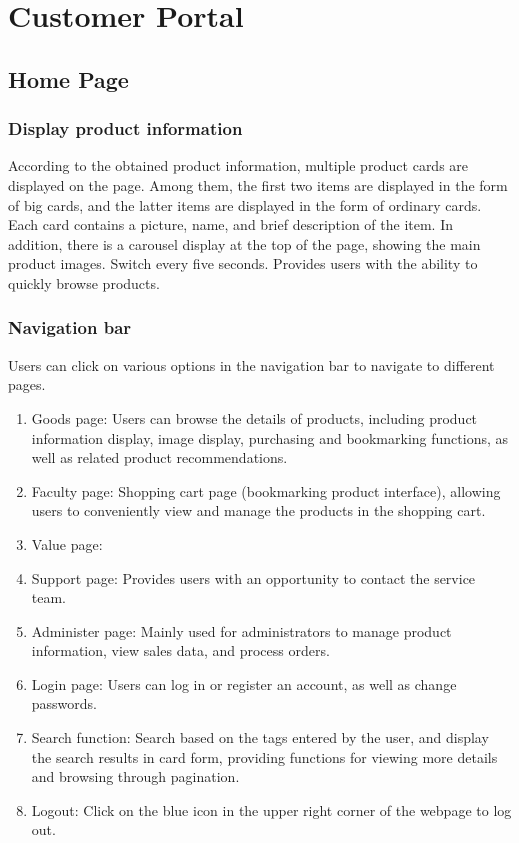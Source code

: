\documentclass{article}
\begin{document}
\section{Customer Portal}
\subsection{Home Page}
\subsubsection{Display product information}
According to the obtained product information, multiple product cards are displayed on the page. Among them, the first two items are displayed in the form of big cards, and the latter items are displayed in the form of ordinary cards. Each card contains a picture, name, and brief description of the item. In addition, there is a carousel display at the top of the page, showing the main product images. Switch every five seconds. Provides users with the ability to quickly browse products.

\subsubsection{Navigation bar}
Users can click on various options in the navigation bar to navigate to different pages.
\begin{enumerate}
    \item Goods page: Users can browse the details of products, including product information display, image display, purchasing and bookmarking functions, as well as related product recommendations.
    \item Faculty page: Shopping cart page (bookmarking product interface), allowing users to conveniently view and manage the products in the shopping cart.
    \item Value page:
    \item Support page: Provides users with an opportunity to contact the service team.
    \item Administer page: Mainly used for administrators to manage product information, view sales data, and process orders.
    \item Login page: Users can log in or register an account, as well as change passwords.
    \item Search function: Search based on the tags entered by the user, and display the search results in card form, providing functions for viewing more details and browsing through pagination.
    \item Logout: Click on the blue icon in the upper right corner of the webpage to log out.
\end{enumerate}
\end{document}

